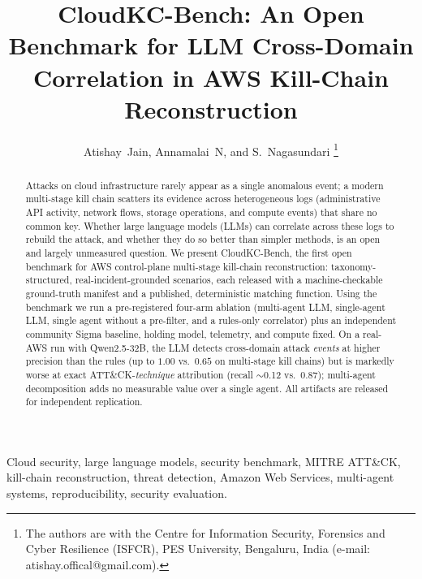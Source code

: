 \documentclass[journal]{IEEEtran}
\begin{document}
\title{CloudKC-Bench: An Open Benchmark for LLM Cross-Domain\\Correlation in AWS Kill-Chain Reconstruction}

\author{Atishay~Jain, Annamalai~N, and S.~Nagasundari%
\thanks{The authors are with the Centre for Information Security, Forensics and Cyber Resilience
(ISFCR), PES University, Bengaluru, India (e-mail: atishay.offical@gmail.com).}}

\maketitle

\begin{abstract}
Attacks on cloud infrastructure rarely appear as a single anomalous event; a modern multi-stage
kill chain scatters its evidence across heterogeneous logs (administrative API activity, network
flows, storage operations, and compute events) that share no common key. Whether large language
models (LLMs) can correlate across these logs to rebuild the attack, and whether they do so better
than simpler methods, is an open and largely unmeasured question. We present CloudKC-Bench, the
first open benchmark for AWS control-plane multi-stage kill-chain reconstruction: taxonomy-structured,
real-incident-grounded scenarios, each released with a machine-checkable ground-truth manifest and a
published, deterministic matching function. Using the benchmark we run a pre-registered four-arm
ablation (multi-agent LLM, single-agent LLM, single agent without a pre-filter, and a rules-only
correlator) plus an independent community Sigma baseline, holding model, telemetry, and compute
fixed. On a real-AWS run with Qwen2.5-32B, the LLM detects cross-domain attack \emph{events} at
higher precision than the rules (up to $1.00$ vs.\ $0.65$ on multi-stage kill chains) but is markedly
worse at exact ATT\&CK-\emph{technique} attribution (recall $\sim$0.12 vs.\ $0.87$); multi-agent
decomposition adds no measurable value over a single agent. All artifacts are released for
independent replication.
\end{abstract}

\begin{IEEEkeywords}
Cloud security, large language models, security benchmark, MITRE ATT\&CK, kill-chain reconstruction,
threat detection, Amazon Web Services, multi-agent systems, reproducibility, security evaluation.
\end{IEEEkeywords}

\end{document}
